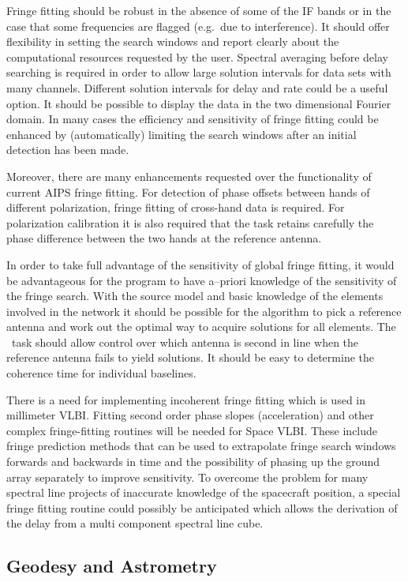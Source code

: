 Fringe fitting should be robust in the absence of some of the IF bands
or in the case that some frequencies are flagged (e.g.\ due to
interference).  It should offer flexibility in setting the search
windows and report clearly about the computational resources requested
by the user.  Spectral averaging before delay searching is required in
order to allow large solution intervals for data sets with many
channels.  Different solution intervals for delay and rate could be a
useful option. It should be possible to display the data in the two
dimensional Fourier domain. In many cases the efficiency and
sensitivity of fringe fitting could be enhanced by (automatically)
limiting the search windows after an initial detection has been made.

Moreover, there are many enhancements requested over the functionality
of current AIPS fringe fitting. For detection of phase offsets between
hands of different polarization, fringe fitting of cross-hand data is
required. For polarization calibration it is also required that the
task retains carefully the phase difference between the two hands at
the reference antenna.

In order to take full advantage of the sensitivity of global fringe
fitting, it would be advantageous for the program to have a--priori
knowledge of the sensitivity of the fringe search.  With the source
model and basic knowledge of the elements involved in the network it
should be possible for the algorithm to pick a reference antenna and
work out the optimal way to acquire solutions for all elements. The
\aipspp\ task should allow control over which antenna is second in line
when the reference antenna fails to yield solutions. It should be easy
to determine the coherence time for individual baselines.

There is a need for implementing incoherent fringe fitting which is
used in millimeter VLBI. Fitting second order phase slopes
(acceleration) and other complex fringe-fitting routines will be
needed for Space VLBI. These include fringe prediction methods that
can be used to extrapolate fringe search windows forwards and
backwards in time and the possibility of phasing up the ground array
separately to improve sensitivity. To overcome the problem for many
spectral line projects of inaccurate knowledge of the spacecraft
position, a special fringe fitting routine could possibly be
anticipated which allows the derivation of the delay from a multi
component spectral line cube.

\subsection{Geodesy and Astrometry}

